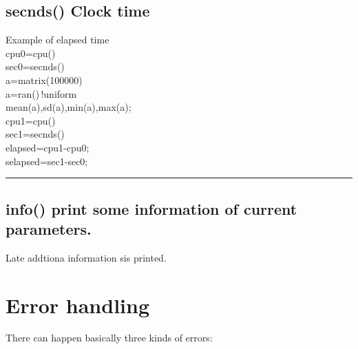 \subsection{\textcolor{VioletRed}{secnds}() Clock time} 
\label{secnds} 
\singlespacing 
\begin{example}[secondsex]Example of elapsed time\\ 
\label{secondsex} 
\noindent cpu0=\textcolor{VioletRed}{cpu}()\\ 
sec0=\textcolor{VioletRed}{secnds}()\\ 
a=\textcolor{VioletRed}{matrix}(100000)\\ 
a=\textcolor{VioletRed}{ran}()\,{\color{ForestGreen}!uniform}\\ 
\textcolor{VioletRed}{mean}(a),\textcolor{VioletRed}{sd}(a),\textcolor{VioletRed}{min}(a),\textcolor{VioletRed}{max}(a);\\ 
cpu1=\textcolor{VioletRed}{cpu}()\\ 
sec1=\textcolor{VioletRed}{secnds}()\\ 
elapsed=cpu1-cpu0;\\ 
selapsed=sec1-sec0;\\ 
\end{example} 
\vspace{-7mm} \rule{5cm}{0.1pt} 
\onehalfspacing 
\subsection{\textcolor{VioletRed}{info}() print some information of current parameters.} 
\label{info} 
\begin{note} 
Late addtiona information sis printed. 
\end{note} 
\section{Error handling} 
\label{error} 
There can happen basically three kinds of errors: 
